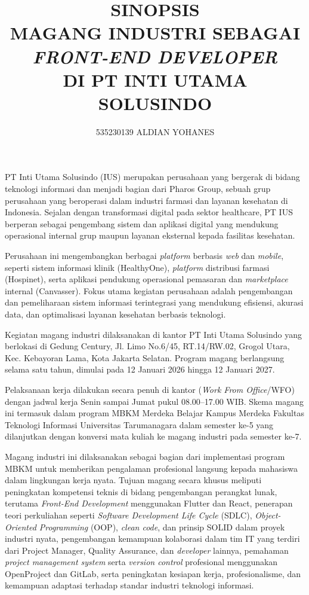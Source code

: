 \documentclass[12pt, a4paper]{article}
\title{
    SINOPSIS\\
    MAGANG INDUSTRI SEBAGAI \textit{FRONT-END DEVELOPER}\\
    DI PT INTI UTAMA SOLUSINDO
}
\author{535230139 ALDIAN YOHANES}
\begin{document}
\makeatletter
\begin{center}
    \large\textbf{\@title}
\end{center}

\makeatother
PT Inti Utama Solusindo (IUS) merupakan perusahaan yang bergerak di 
bidang teknologi informasi dan menjadi bagian dari Pharos Group, 
sebuah grup perusahaan yang beroperasi dalam industri farmasi dan 
layanan kesehatan di Indonesia. Sejalan dengan transformasi digital 
pada sektor healthcare, PT IUS berperan sebagai pengembang sistem dan 
aplikasi digital yang mendukung operasional internal grup maupun 
layanan eksternal kepada fasilitas kesehatan.

Perusahaan ini mengembangkan berbagai \textit{platform} berbasis 
\textit{web} dan \textit{mobile}, seperti sistem informasi klinik 
(HealthyOne), \textit{platform} distribusi farmasi (Hospinet), 
serta aplikasi pendukung operasional pemasaran dan \textit{marketplace} 
internal (Canvasser). Fokus utama kegiatan perusahaan adalah 
pengembangan dan pemeliharaan sistem informasi terintegrasi 
yang mendukung efisiensi, akurasi data, dan optimalisasi layanan 
kesehatan berbasis teknologi.

Kegiatan magang industri dilaksanakan di kantor PT Inti Utama Solusindo 
yang berlokasi di Gedung Century, Jl. Limo No.6/45, RT.14/RW.02, 
Grogol Utara, Kec. Kebayoran Lama, Kota Jakarta Selatan. 
Program magang berlangsung selama satu tahun, dimulai pada 
12 Januari 2026 hingga 12 Januari 2027.

Pelaksanaan kerja dilakukan secara penuh di kantor (\textit{Work From 
Office}/WFO) dengan jadwal kerja Senin sampai Jumat pukul 08.00–17.00 
WIB. Skema magang ini termasuk dalam program MBKM Merdeka 
Belajar Kampus Merdeka Fakultas Teknologi Informasi Universitas 
Tarumanagara dalam semester ke-5 yang dilanjutkan dengan konversi 
mata kuliah ke magang industri pada semester ke-7.

Magang industri ini dilaksanakan sebagai bagian dari implementasi 
program MBKM untuk memberikan pengalaman profesional langsung kepada 
mahasiswa dalam lingkungan kerja nyata. Tujuan magang secara khusus 
meliputi peningkatan kompetensi teknis di bidang pengembangan 
perangkat lunak, terutama \textit{Front-End Development} menggunakan 
Flutter dan React, penerapan teori perkuliahan seperti 
\textit{Software Development Life Cycle} (SDLC), \textit{Object-Oriented 
Programming} (OOP), \textit{clean code}, dan prinsip SOLID dalam 
proyek industri nyata, pengembangan kemampuan kolaborasi 
dalam tim IT yang terdiri dari Project Manager, Quality Assurance, 
dan \textit{developer} lainnya, pemahaman \textit{project 
management system} serta \textit{version control} profesional 
menggunakan OpenProject dan GitLab, serta peningkatan kesiapan 
kerja, profesionalisme, dan kemampuan adaptasi 
terhadap standar industri teknologi informasi.
\end{document}
